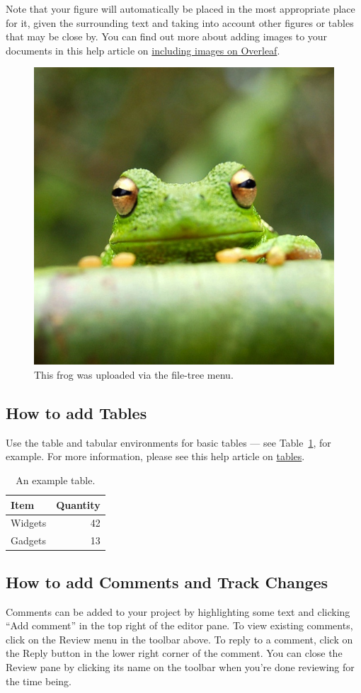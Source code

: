 \documentclass{article}
\begin{document}
Note that your figure will automatically be placed in the most appropriate place for it, given the surrounding text and taking into account other figures or tables that may be close by. You can find out more about adding images to your documents in this help article on \href{https://www.overleaf.com/learn/how-to/Including_images_on_Overleaf}{including images on Overleaf}.

\begin{figure}
\centering
\includegraphics[width=0.25\linewidth]{frog.jpg}
\caption{\label{fig:frog}This frog was uploaded via the file-tree menu.}
\end{figure}

\subsection{How to add Tables}

Use the table and tabular environments for basic tables --- see Table~\ref{tab:widgets}, for example. For more information, please see this help article on \href{https://www.overleaf.com/learn/latex/tables}{tables}. 

\begin{table}
\centering
\begin{tabular}{l|r}
Item & Quantity \\\hline
Widgets & 42 \\
Gadgets & 13
\end{tabular}
\caption{\label{tab:widgets}An example table.}
\end{table}

\subsection{How to add Comments and Track Changes}

Comments can be added to your project by highlighting some text and clicking ``Add comment'' in the top right of the editor pane. To view existing comments, click on the Review menu in the toolbar above. To reply to a comment, click on the Reply button in the lower right corner of the comment. You can close the Review pane by clicking its name on the toolbar when you're done reviewing for the time being.
\end{document}
